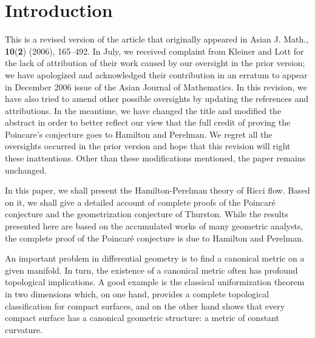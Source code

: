 \chapter{Introduction}
\label{chap:cz-introduction}


This is a revised version of the article that originally appeared
in Asian J. Math., {\bf 10}({\bf 2}) (2006), 165--492. In July, we
received complaint from Kleiner and Lott for the lack of
attribution of their work caused by our oversight in the prior
version; we have apologized and acknowledged their contribution in
an erratum to appear in December 2006 issue of the Asian Journal
of Mathematics. In this revision, we have also tried to amend
other possible oversights by updating the references and
attributions. In the meantime, we have changed the title and
modified the abstract in order to better reflect our view that the
full credit of proving the Poincare's conjecture goes to Hamilton
and Perelman. We regret all the oversights occurred in the prior
version and hope that this revision will right these inattentions.
Other than these modifications mentioned, the paper remains
unchanged.

In this paper, we shall present the Hamilton-Perelman theory of
Ricci flow. Based on it, we shall give a detailed account of
complete proofs of the Poincar\'e conjecture and the
geometrization conjecture of Thurston. While the results presented
here are based on the accumulated works of many geometric
analysts, the complete proof of the Poincar\'e conjecture is due
to Hamilton and Perelman.

An important problem in differential geometry is to find a
canonical metric on a given manifold. In turn, the existence of a
canonical metric often has profound topological implications. A
good example is the classical uniformization theorem in two
dimensions which, on one hand, provides a complete topological
classification for compact surfaces, and on the other hand shows
that every compact surface has a canonical geometric structure: a
metric of constant curvature.

